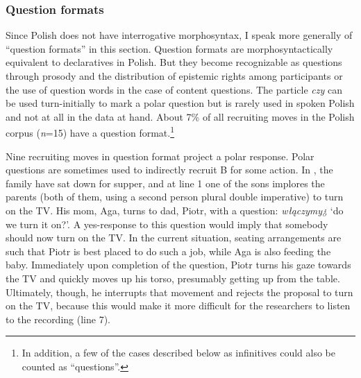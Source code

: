 \documentclass[output=paper]{langsci/langscibook}
\begin{document}
\subsubsection{Question formats}\label{sec:zinken:3.3.4}

Since Polish does not have interrogative morphosyntax, I speak more generally of ``question formats'' in this section.  Question formats are morphosyntactically equivalent to declaratives in Polish.  But they become recognizable as questions through prosody and the distribution of epistemic rights among participants \citep{Weidner2013a} or the use of question words in the case of content questions. The particle \textit{czy} can be used turn-initially to mark a polar question but is rarely used in spoken Polish and not at all in the data at hand. About 7\% of all recruiting moves in the Polish corpus (\textit{n}=15) have a question format.\footnote{In addition, a few of the cases described below as infinitives could also be counted as “questions”.}

Nine recruiting moves in question format project a polar response.  Polar questions are sometimes used to indirectly recruit B for some action.  In , the family have sat down for supper, and at line 1 one of the sons implores the parents (both of them, using a second person plural double imperative) to turn on the TV.  His mom, Aga, turns to dad, Piotr, with a question: \textit{włączymy¿} `do we turn it on?'.  A yes-response to this question would imply that somebody should now turn on the TV.  In the current situation, seating arrangements are such that Piotr is best placed to do such a job, while Aga is also feeding the baby.  Immediately upon completion of the question, Piotr turns his gaze towards the TV and quickly moves up his torso, presumably getting up from the table.  Ultimately, though, he interrupts that movement and rejects the proposal to turn on the TV, because this would make it more difficult for the researchers to listen to the recording (line 7).
\end{document}
